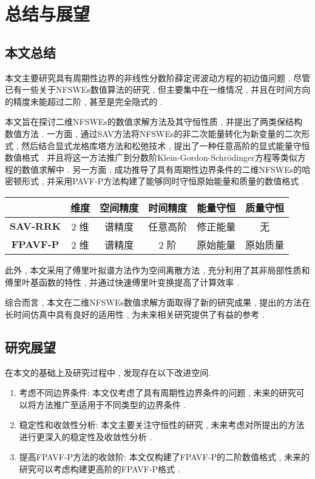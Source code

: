 
\chapter[总结与展望]{总结与展望}
\section{本文总结}
本文主要研究具有周期性边界的非线性分数阶薛定谔波动方程的初边值问题 . 尽管已有一些关于NFSWEs数值算法的研究 , 但主要集中在一维情况 , 并且在时间方向的精度未能超过二阶 , 甚至是完全隐式的 . 

本文旨在探讨二维NFSWEs的数值求解方法及其守恒性质 , 并提出了两类保结构数值方法 . 一方面 , 通过SAV方法将NFSWEs的非二次能量转化为新变量的二次形式 , 然后结合显式龙格库塔方法和松弛技术 , 提出了一种任意高阶的显式能量守恒数值格式 . 并且将这一方法推广到分数阶Klein-Gordon-Schr{\"o}dinger方程等类似方程的数值求解中 . 另一方面 , 成功推导了具有周期性边界条件的二维NFSWEs的哈密顿形式 , 并采用PAVF-P方法构建了能够同时守恒原始能量和质量的数值格式 . 

\begin{table}[H]
    \centering
      \begin{tabular}{cccccc}
      \toprule
      \textcolor[rgb]{0 , 0 , 0}{} & \textcolor[rgb]{0 , 0 , 0}{\textbf{维度}} & \textcolor[rgb]{0 , 0 , 0}{\textbf{空间精度}} & \textcolor[rgb]{0 , 0 , 0}{\textbf{时间精度}} & \textcolor[rgb]{0 , 0 , 0}{\textbf{能量守恒}} & \textcolor[rgb]{0 , 0 , 0}{\textbf{质量守恒}} \\
      \midrule
      \textcolor[rgb]{0 , 0 , 0}{\textbf{SAV-RRK}} & {2 维}   &{谱精度}   & {任意高阶}  & 修正能量  & 无 \\
      \midrule
      \textcolor[rgb]{0 , 0 , 0}{\textbf{FPAVF-P}} & {2 维}   & {谱精度}   & 2 阶   & {原始能量}  & {原始质量} \\
      \bottomrule
      \end{tabular}%
    \label{tab:3}%
  \end{table}%

此外 , 本文采用了傅里叶拟谱方法作为空间离散方法 , 充分利用了其非局部性质和傅里叶基函数的特性 , 并通过快速傅里叶变换提高了计算效率 . 

综合而言 , 本文在二维NFSWEs数值求解方面取得了新的研究成果 , 提出的方法在长时间仿真中具有良好的适用性 , 为未来相关研究提供了有益的参考 . 

\section{研究展望}
在本文的基础上及研究过程中 , 发现存在以下改进空间.

\begin{enumerate}[(1)]
    \item 考虑不同边界条件: 本文仅考虑了具有周期性边界条件的问题 , 未来的研究可以将方法推广至适用于不同类型的边界条件 .
    \item 稳定性和收敛性分析: 本文主要关注守恒性的研究 , 未来考虑对所提出的方法进行更深入的稳定性及收敛性分析 . 
    \item 提高FPAVF-P方法的收敛阶: 本文仅构建了FPAVF-P的二阶数值格式 , 未来的研究可以考虑构建更高阶的FPAVF-P格式 . 
\end{enumerate}
